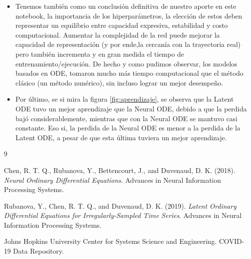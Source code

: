 \documentclass[11pt,letterpaper]{article}
\begin{document}
\begin{itemize}
    \item Tenemos también como un conclusión definitiva de nuestro aporte en este notebook, la importancia de los hiperparámetros, la elección de estos deben representar un equilibrio entre capacidad expresiva, estabilidad y costo computacional. Aumentar la complejidad de la red puede mejorar la capacidad de representación (y por ende,la cercanía con la trayectoria real) pero también incrementa y en gran medida el tiempo de entrenamiento/ejecución. De hecho y como pudimos observar, los modelos basados en ODE, tomaron mucho más tiempo computacional que el método clásico (un método nunérico), sin incluso lograr un mejor desempeño.
\item Por último, se si mira la figura \ref{fig:aprendizaje}, se observa que la Latent ODE tuvo un mejor aprendizaje que la Neural ODE, debido a que la perdida bajó considerablemente, mientras que con la Neural ODE se mantuvo casi constante. Eso si, la perdida de la Neural ODE es menor a la perdida de la Latent ODE, a pesar de que esta última tuviera un mejor aprendizaje.
\end{itemize}

\begin{thebibliography}{9}

Chen, R. T. Q., Rubanova, Y., Bettencourt, J., and Duvenaud, D. K. (2018). \textit{Neural Ordinary Differential Equations}. Advances in Neural Information Processing Systems.

Rubanova, Y., Chen, R. T. Q., and Duvenaud, D. K. (2019). \textit{Latent Ordinary Differential Equations for Irregularly-Sampled Time Series}. Advances in Neural Information Processing Systems.

Johns Hopkins University Center for Systems Science and Engineering. COVID-19 Data Repository.

\end{thebibliography}
\end{document}
